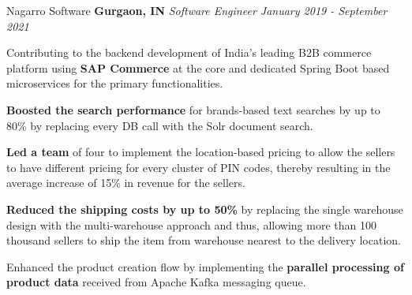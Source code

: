 \begin{cventries2}
\cventrynew
    {Nagarro Software}  {\bf {Gurgaon, IN}}
    {\textnormal{\textit{Software Engineer  \hfill {January 2019 - September 2021}}}}
    {
      \begin{cvitems} %
        \item {Contributing to the backend development of India’s leading B2B commerce platform using {\bf SAP Commerce} at the core and dedicated Spring Boot based microservices for the primary functionalities.}
        \item{{\bf Boosted the search performance} for brands-based text searches by up to 80\% by replacing every DB call with the Solr document search.}
        \item {{\bf Led a team} of four to implement the location-based pricing to allow the sellers to have different pricing for every cluster of PIN codes, thereby resulting in the average increase of 15\% in revenue for the sellers.}
        \item { {\bf Reduced the shipping costs by up to 50\%} by replacing the single warehouse design with the multi-warehouse approach and thus, allowing more than 100 thousand sellers to ship the item from warehouse nearest to the delivery location.}
        \item {Enhanced the product creation flow by implementing the {\bf parallel processing of product data} received from Apache Kafka messaging queue.}
      \end{cvitems}
    }
\vspace{10pt} 

\end{cventries2}
